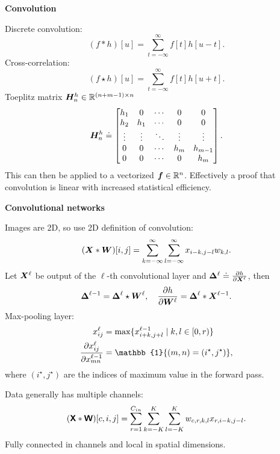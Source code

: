 \documentclass[10pt]{article}
\newenvironment{topic}[1]
{\textbf{\sffamily \colorbox{black}{\rlap{\textbf{\textcolor{white}{#1}}}\hspace{\linewidth}\hspace{-2\fboxsep}}}}
{}
\newenvironment{subtopic}[1]
{\begin{center}\textbf{\sffamily #1}\end{center}}
{}
\begin{document}
\begin{multicols*}{3}
\begin{topic}{Convolutional networks}
\begin{subtopic}{Convolution}
            Discrete convolution: \[
                (f * h)[u] = \sum_{t=-\infty}^{\infty} f[t]h[u-t].
            \]
            Cross-correlation: \[
                (f \star h)[u] = \sum_{t=-\infty}^{\infty} f[t] h[u+t].
            \]
            Toeplitz matrix $\bm{H}_n^h \in \mathbb{R}^{(n+m-1)\times n}$ \[
                \bm{H}_n^h \doteq
                \begin{bmatrix}
                    h_1    & 0      & \cdots & 0      & 0       \\
                    h_2    & h_1    & \cdots & 0      & 0       \\
                    \vdots & \vdots & \ddots & \vdots & \vdots  \\
                    0      & 0      & \cdots & h_m    & h_{m-1} \\
                    0      & 0      & \cdots & 0      & h_m
                \end{bmatrix}.
            \]
            This can then be applied to a vectorized $\bm{f} \in \mathbb{R}^n$. Effectively a proof that convolution
            is linear with increased statistical efficiency.
        \end{subtopic}

        \begin{subtopic}{Convolutional networks}
            Images are 2D, so use 2D definition of convolution: \[
                (\bm{X} * \bm{W})[i,j] = \sum_{k=-\infty}^{\infty} \sum_{l=-\infty}^{\infty} x_{i-k,j-l} w_{k,l}.
            \]
            Let $\bm{X}^{\ell}$ be output of the $\ell$-th convolutional layer and $\bm{\Delta}^{\ell} \doteq
                \pdv{h}{\bm{X}^{\ell}}$, then \[
                \bm{\Delta}^{\ell-1} = \bm{\Delta}^{\ell} \star \bm{W}^{\ell}, \quad \pdv{h}{\bm{W}^{\ell}} = \bm{\Delta}^{\ell} * \bm{X}^{\ell-1}.
            \]
            Max-pooling layer:
            \begin{align*}
                x^{\ell}_{ij} & = \max \{ x^{\ell-1}_{i+k,j+l} \mid k, l \in [0,r) \} \\
                \pdv{x_{ij}^{\ell}}{x^{\ell-1}_{mn}} & = \mathbb{1}\{ (m,n) = (i^\star,j^\star) \},
            \end{align*}
            where $(i^\star, j^\star)$ are the indices of maximum value in the forward pass.

            Data generally has multiple channels: \[
                (\bm{\mathsf{X}} * \bm{\mathsf{W}})[c,i,j] = \sum_{r=1}^{C_{in}} \sum_{k=-K}^{K} \sum_{l=-K}^{K} w_{c,r,k,l} x_{r,i-k,j-l}.
            \]
            Fully connected in channels and local in spatial dimensions.
        \end{subtopic}


\end{topic}
\end{multicols*}
\end{document}
